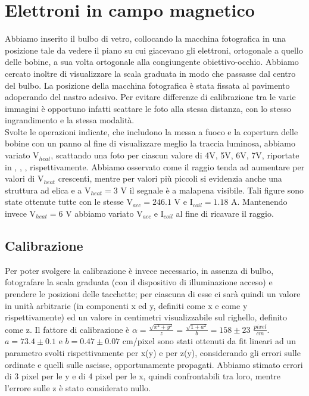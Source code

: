 \section{Elettroni in campo magnetico}
Abbiamo inserito il bulbo di vetro, collocando la macchina fotografica in una posizione tale da vedere il piano su cui giacevano gli elettroni, ortogonale a quello delle bobine, a sua volta ortogonale alla congiungente obiettivo-occhio. Abbiamo cercato inoltre di visualizzare la scala graduata in modo che passasse dal centro del bulbo. La posizione della macchina fotografica è stata fissata al pavimento adoperando del nastro adesivo. Per evitare differenze di calibrazione tra le varie immagini è opportuno infatti scattare le foto alla stessa distanza, con lo stesso ingrandimento e la stessa modalità.\\
Svolte le operazioni indicate, che includono la messa a fuoco e la copertura delle bobine con un panno al fine di visualizzare meglio la traccia luminosa, abbiamo variato V$_{heat}$, scattando una foto per ciascun valore di 4V, 5V, 6V, 7V, riportate in , , ,  rispettivamente. Abbiamo osservato come il raggio tenda ad aumentare per valori di V$_{heat}$ crescenti, mentre per valori più piccoli si evidenzia anche una struttura ad elica e a V$_{heat} = 3$ V il segnale è a malapena visibile. Tali figure sono state ottenute tutte con le stesse V$_{acc} = 246.1$ V e I$_{coil} = 1.18$ A. Mantenendo invece V$_{heat} = 6$ V abbiamo variato V$_{acc}$ e I$_{coil}$ al fine di ricavare il raggio.\\
\subsection{Calibrazione}
Per poter svolgere la calibrazione è invece necessario, in assenza di bulbo, fotografare la scala graduata (con il dispositivo di illuminazione acceso) e prendere le posizioni delle tacchette; per ciascuna di esse ci sarà quindi un valore in unità arbitrarie (in componenti x ed y, definiti come x e come y rispettivamente) ed un valore in centimetri visualizzabile sul righello, definito come z. Il fattore di calibrazione è $\alpha = \frac{\sqrt{x^2+y^2}}{z} = \frac{ \sqrt{1+a^2} }{b} = 158 \pm 23$ $\frac{pixel}{cm}$. $a = 73.4 \pm 0.1$ e $b = 0.47 \pm 0.07$ cm/pixel sono stati ottenuti da fit lineari ad un parametro svolti rispettivamente per x(y) e per z(y), considerando gli errori sulle ordinate e quelli sulle ascisse, opportunamente propagati. Abbiamo stimato errori di 3 pixel per le y e di 4 pixel per le x, quindi confrontabili tra loro, mentre l'errore sulle z è stato considerato nullo.
